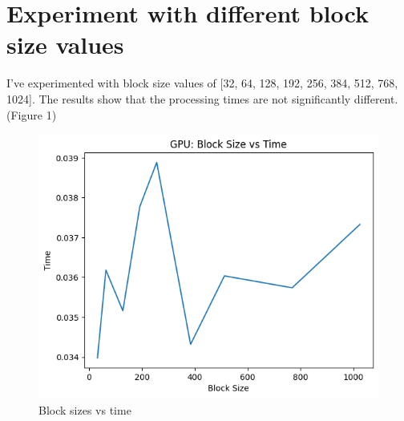 \documentclass{article}
\begin{document}
\section{Experiment with different block size values}
I've experimented with block size values of [32, 64, 128, 192, 256, 384, 512, 768, 1024]. The results show that the processing times are not significantly different. (Figure 1)
\begin{figure}
    \centering
    \includegraphics[width=0.5\linewidth]{images/block_time__vs__time.png}
    \caption{Block sizes vs time}
    \label{fig:enter-label}
\end{figure}
\end{document}
